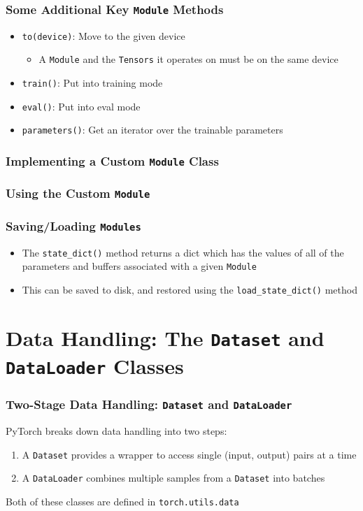 \documentclass[xcolor={x11names,table}]{beamer}
\begin{document}
\begin{frame}
	\frametitle{Some Additional Key \lstinline!Module! Methods}
	\begin{itemize}
		\item \lstinline!to(device)!: Move to the given device
		\begin{itemize}
			\item A \lstinline!Module! and the \lstinline!Tensors! it operates on must be on the same device
		\end{itemize}
		\item \lstinline!train()!: Put into training mode
		\item \lstinline!eval()!: Put into eval mode
		\item \lstinline!parameters()!: Get an iterator over the trainable parameters
	\end{itemize}
\end{frame}

\begin{frame}
	\frametitle{Implementing a Custom \lstinline!Module! Class}
	{
		\small
		
	}
\end{frame}

\begin{frame}
	\frametitle{Using the Custom \lstinline!Module!}
	
\end{frame}

\begin{frame}
	\frametitle{Saving/Loading \lstinline!Modules!}
	\begin{itemize}
		\item The \lstinline!state_dict()! method returns a dict which has the values of all of the parameters and buffers associated with a given \lstinline!Module!
		\item This can be saved to disk, and restored using the \lstinline!load_state_dict()! method
	\end{itemize}
	
\end{frame}

\section{Data Handling: The \lstinline!Dataset! and \lstinline!DataLoader! Classes}

\begin{frame}
	\frametitle{Two-Stage Data Handling: \lstinline!Dataset! and \lstinline!DataLoader!}
	PyTorch breaks down data handling into two steps:
	\begin{enumerate}
		\item A \lstinline!Dataset! provides a wrapper to access single (input, output) pairs at a time
		\item A \lstinline!DataLoader! combines multiple samples from a \lstinline!Dataset! into batches
	\end{enumerate}
	Both of these classes are defined in \lstinline!torch.utils.data!
\end{frame}
\end{document}
